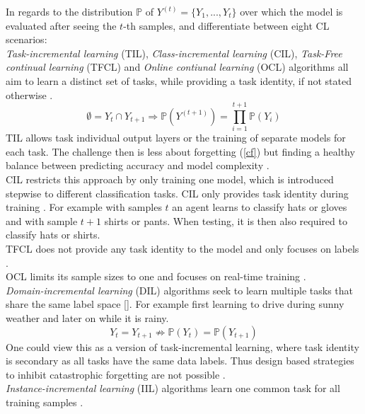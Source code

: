 In regards to the distribution $\mathbb{P}$ of $Y^{(t)} = \{Y_1, ..., Y_t\}$ over which the model is evaluated after seeing the $t$-th samples, \cite{bidaki2025} and \cite{LW} differentiate between eight CL scenarios:\\
\textit{Task-incremental learning} (TIL), \textit{Class-incremental learning} (CIL), \textit{Task-Free continual learning} (TFCL) and \textit{Online contiunal learning} (OCL) algorithms all aim to learn a distinct set of tasks, while providing a task identity, if not stated otherwise \cite{bidaki2025, LW}.
\begin{equation}
	\emptyset = Y_t \cap Y_{t+1} \Rightarrow \mathbb{P}(Y^{(t+1)}) = \prod_{i = 1}^{t+1}\mathbb{P}(Y_i)
\end{equation}
TIL allows task individual output layers or the training of separate models for each task. The challenge then is less about forgetting (\autoref{cf}) but finding a healthy balance between predicting accuracy and model complexity \cite{vandeVen2022}.\\
CIL restricts this approach by only training one model, which is introduced stepwise to different classification tasks. CIL only provides task identity during training \cite{vandeVen2022}. For example with samples $t$ an agent learns to classify hats or gloves and with sample $t+1$ shirts or pants. When testing, it is then also required to classify hats or shirts.\\
TFCL does not provide any task identity to the model and only focuses on labels \cite{aljundi2019tfcl}.\\
OCL limits its sample sizes to one and focuses on real-time training \cite{bidaki2025, LW}.\\
\textit{Domain-incremental learning} (DIL) algorithms seek to learn multiple tasks that share the same label space []. For example first learning to drive during sunny weather and later on while it is rainy.
\begin{equation}
	Y_t=Y_{t+1} \nRightarrow \mathbb{P}(Y_t) = \mathbb{P}(Y_{t+1})
\end{equation}
One could view this as a version of task-incremental learning, where task identity is secondary as all tasks have the same data labels. Thus design based strategies to inhibit catastrophic forgetting are not possible \cite{vandeVen2022}.\\
\textit{Instance-incremental learning} (IIL) algorithms learn one common task for all training samples \cite{bidaki2025, LW}.
